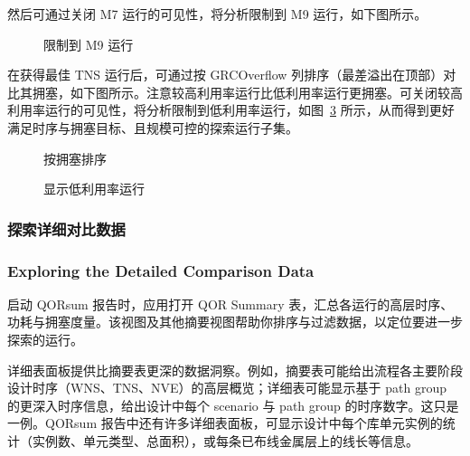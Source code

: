 然后可通过关闭 M7 运行的可见性，将分析限制到 M9 运行，如下图所示。

\begin{figure}[htbp]
\centering
{}
\caption{限制到 M9 运行}
\label{fig:m9-only}
\end{figure}

在获得最佳 TNS 运行后，可通过按 GRCOverflow 列排序（最差溢出在顶部）对比其拥塞，如下图所示。注意较高利用率运行比低利用率运行更拥塞。可关闭较高利用率运行的可见性，将分析限制到低利用率运行，如图~\ref{fig:lower-util} 所示，从而得到更好满足时序与拥塞目标、且规模可控的探索运行子集。

\begin{figure}[htbp]
\centering
{}
\caption{按拥塞排序}
\label{fig:grc-overflow}
\end{figure}

\begin{figure}[htbp]
\centering
{}
\caption{显示低利用率运行}
\label{fig:lower-util}
\end{figure}

\subsubsection{探索详细对比数据}
\subsubsection*{Exploring the Detailed Comparison Data}

启动 QORsum 报告时，应用打开 QOR Summary 表，汇总各运行的高层时序、功耗与拥塞度量。该视图及其他摘要视图帮助你排序与过滤数据，以定位要进一步探索的运行。

详细表面板提供比摘要表更深的数据洞察。例如，摘要表可能给出流程各主要阶段设计时序（WNS、TNS、NVE）的高层概览；详细表可能显示基于 path group 的更深入时序信息，给出设计中每个 scenario 与 path group 的时序数字。这只是一例。QORsum 报告中还有许多详细表面板，可显示设计中每个库单元实例的统计（实例数、单元类型、总面积），或每条已布线金属层上的线长等信息。

